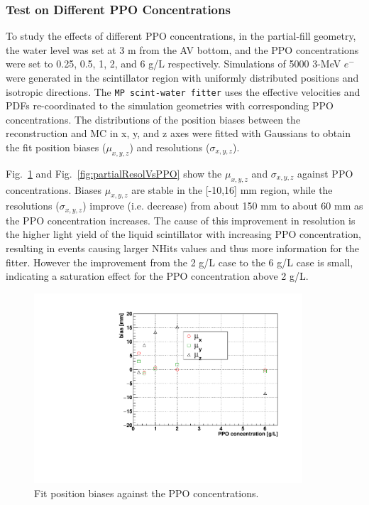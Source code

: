 \subsubsection{Test on Different PPO Concentrations}\label{sect:ppoConcentration}

To study the effects of different PPO concentrations, in the partial-fill geometry, the water level was set at 3 m from the AV bottom, and the PPO concentrations were set to 0.25, 0.5, 1, 2, and 6 g/L respectively. Simulations of 5000 3-MeV $e^-$ were generated in the scintillator region with uniformly distributed positions and isotropic directions. The \texttt{MP scint-water fitter} uses the effective velocities and PDFs re-coordinated to the simulation geometries with corresponding PPO concentrations. The distributions of the position biases between the reconstruction and MC in x, y, and z axes were fitted with Gaussians to obtain the fit position biases ($\mu_{x,y,z}$) and resolutions ($\sigma_{x,y,z}$).

Fig.~\ref{fig:partialBiasVsPPO} and Fig.~\ref{fig:partialResolVsPPO} show the $\mu_{x,y,z}$ and $\sigma_{x,y,z}$ against PPO concentrations. Biases $\mu_{x,y,z}$ are stable in the [-10,16] mm region, while the resolutions ($\sigma_{x,y,z}$) improve (i.e. decrease) from about 150 mm to about 60 mm as the PPO concentration increases. The cause of this improvement in resolution is the higher light yield of the liquid scintillator with increasing PPO concentration, resulting in events causing larger NHits values and thus more information for the fitter. However the improvement from the 2 g/L case to the 6 g/L case is small, indicating a saturation effect for the PPO concentration above 2 g/L.

\begin{figure}[!htb]
	\centering
	\includegraphics[width=10cm]{partialBiasVsPPO.pdf}
	\caption{Fit position biases against the PPO concentrations.	\label{fig:partialBiasVsPPO}}
\end{figure}

